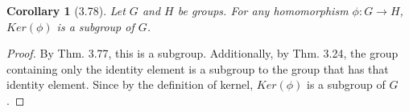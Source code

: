 \documentclass{article}
\newtheorem*{cor}{Corollary}
\begin{document}
\begin{cor}[3.78]
	Let $G$ and $H$ be groups. For any homomorphism $\phi:G \rightarrow H$, $Ker(\phi)$ is a subgroup of $G$. 
\end{cor}
\begin{proof}
	By Thm. 3.77, this is a subgroup. Additionally, by Thm. 3.24, the group containing only the identity element
	is a subgroup to the group that has that identity element. Since by the definition of kernel, $Ker(\phi)$ is a subgroup of $G$.
	
\end{proof}
\end{document}
